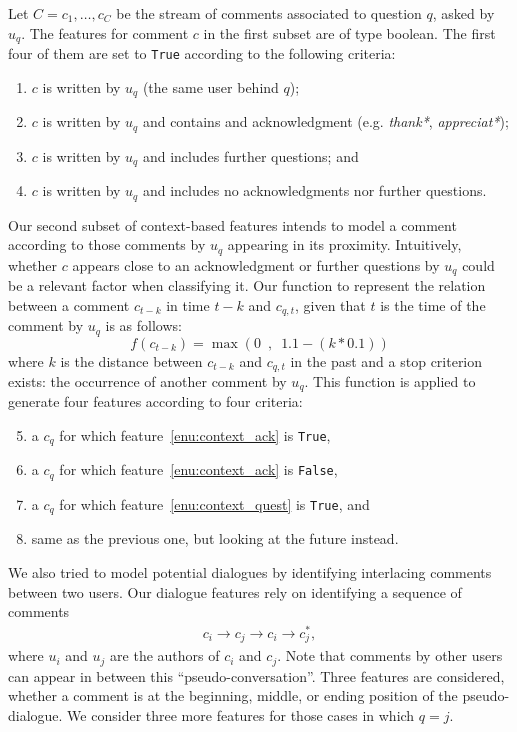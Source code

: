 Let $C={c_1, \ldots,c_C}$ be the stream of comments associated to question $q$, 
asked by $u_q$. The features for comment $c$ in the first subset are of type 
boolean. The first four of them are set to \texttt{True} according to the 
following criteria:

\begin{enumerate}
\item $c$ is written by $u_q$ (\ie the same user behind $q$); 
\item \label{enu:context_ack} 
  $c$ is written by $u_q$ and contains and acknowledgment (e.g.   
  \textit{thank*}, \textit{appreciat*});
\item \label{enu:context_quest}
  $c$ is written by $u_q$ and includes further questions; and
\item $c$ is written by $u_q$ and includes no acknowledgments nor further 
questions.
\end{enumerate}
% 
Our second subset of context-based features intends to model a comment according 
to those comments by $u_q$ appearing in its proximity. Intuitively, whether $c$ 
appears close to an acknowledgment or further questions by $u_q$ could be a 
relevant factor when classifying it. Our function to represent the relation 
between a comment $c_{t-k}$ in time $t-k$ and $c_{q,t}$, given that $t$ 
is the time of the comment by $u_q$ is as follows:
% 
\begin{equation}
 f(c_{t-k})=\max \left(0\enspace,\enspace 1.1-(k*0.1) \right)
\end{equation}
%
where $k$ is the distance between $c_{t-k}$ and $c_{q,t}$ in the past and a 
stop criterion exists: the occurrence of another comment by $u_q$. This function 
is applied to generate four features according to four criteria:

\begin{enumerate}\setcounter{enumi}{4}
\item a $c_q$ for which feature~\ref{enu:context_ack} is \texttt{True},
\item a $c_q$ for which feature~\ref{enu:context_ack} is \texttt{False}, 
\item a $c_q$ for which feature~\ref{enu:context_quest} is \texttt{True}, and 
\item same as the previous one, but looking at the future instead. 
\end{enumerate}


We also tried to model potential dialogues by identifying interlacing comments 
between two users. Our dialogue features rely on identifying 
a sequence of comments 
\begin{align*}
c_i \rightarrow c_j \rightarrow c_i \rightarrow c_j^*,
\end{align*}
% 
where $u_i$ and $u_j$ are the authors of $c_i$ and $c_j$. 
Note that comments by other 
users can appear in between this ``pseudo-conversation''. Three features are 
considered, whether a comment is at the beginning, middle, or ending position of 
the pseudo-dialogue. We consider three more features for those cases in which 
$q=j$. 


